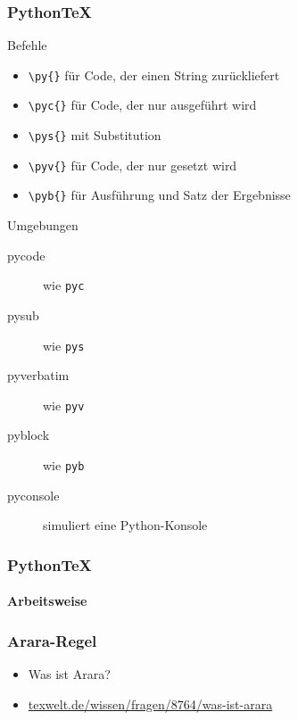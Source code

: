 \documentclass[12pt,ngerman]{beamer}
\newcommand{\pyc}[1]{\lstinline[language={Python}]{#1}}
\begin{document}
\begin{frame}[fragile]
\frametitle{Python\TeX}

Befehle

\begin{itemize}
\item \verb|\py{}|  für Code, der einen String zurückliefert
\item \verb|\pyc{}|  für Code, der nur ausgeführt wird
\item \verb|\pys{}|  mit Substitution
\item \verb|\pyv{}|  für Code, der nur gesetzt wird
\item \verb|\pyb{}|  für Ausführung und Satz der Ergebnisse
\end{itemize}

Umgebungen

\begin{description}
\item[pycode] wie \texttt{pyc}
\item[pysub] wie \texttt{pys}
\item[pyverbatim] wie \texttt{pyv}
\item[pyblock] wie \texttt{pyb}
\item[pyconsole] simuliert eine Python-Konsole
\end{description}

\end{frame}

\begin{frame}
\frametitle{Python\TeX}
\framesubtitle{Arbeitsweise}



\end{frame}

\begin{frame}[fragile]
\frametitle{Arara-Regel}

\begin{itemize}
	\item Was ist Arara?
	\item \url{texwelt.de/wissen/fragen/8764/was-ist-arara}
\end{itemize}

 


\end{frame}
\end{document}

